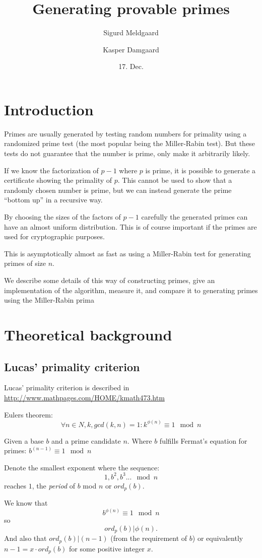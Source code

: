 \documentclass[11pt,a4paper]{article}
\title{Generating provable primes}
\author{Sigurd Meldgaard \and Kasper Damgaard}
\date{17. Dec.}
\begin{document}
\maketitle
\section{Introduction}
Primes are usually generated by testing random numbers for primality
using a randomized prime test (the most popular being the Miller-Rabin
test).  But these tests do not guarantee that the number is prime,
only make it arbitrarily likely.

If we know the factorization of $p-1$ where $p$ is prime, it is
possible to generate a certificate showing the primality of $p$. This
cannot be used to show that a randomly chosen number is prime, but we
can instead generate the prime ``bottom up'' in a recursive way.

By choosing the sizes of the factors of $p-1$ carefully the generated
primes can have an almost uniform distribution. This is of course
important if the primes are used for cryptographic purposes.

This is asymptotically almost as fast as using a Miller-Rabin test for
generating primes of size $n$.

We describe some details of this way of constructing primes, give an
implementation of the algorithm, measure it, and compare it to
generating primes using the Miller-Rabin prima
\section{Theoretical background}
\subsection{Lucas' primality criterion}
Lucas' primality criterion is described in \url{http://www.mathpages.com/HOME/kmath473.htm}

Eulers theorem:
\[
\forall n\in N, k, gcd(k,n)=1: k^{\phi(n)} \equiv 1 \mod n
\]

Given a base $b$ and a prime candidate $n$. Where $b$ fulfills Fermat's equation for primes:
$b^{(n-1)}  \equiv  1    \mod n$

Denote the smallest exponent where the sequence:
\[1, b^2, b^3 ... \mod n\]
reaches $1$, the \emph{period} of $b$ mod $n$ or $ord_p(b)$. 

We know that 
\[b^{\phi(n)} \equiv 1 \mod n\]
 so 
\[ord_p(b)|\phi(n).\] 
And also that \mbox{$ord_p(b)|(n-1)$} (from the requirement of $b$) or
equivalently $n-1 = x\cdot ord_p(b)$ for some positive integer $x$.
\end{document}

